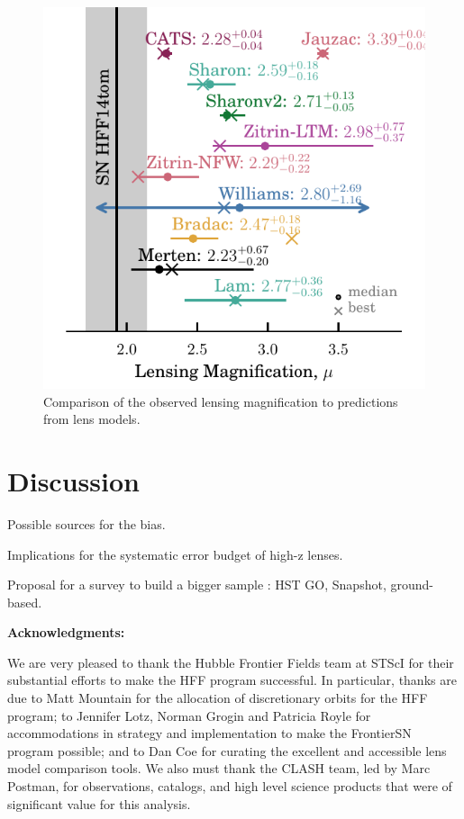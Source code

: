 \begin{figure}
\begin{center}
\includegraphics[width=\columnwidth]{FIG/lensing_test}
\caption{ 
Comparison of the observed lensing magnification to predictions from
lens models.
\label{fig:lensingtest} }
\end{center}
\end{figure}


\section{Discussion}

Possible sources for the bias. 

Implications for the systematic error budget of high-z lenses.

Proposal for a survey to build a bigger sample : HST GO, Snapshot, ground-based.

\bigskip


{\bf Acknowledgments:}

We are very pleased to thank the Hubble Frontier Fields team at STScI
for their substantial efforts to make the HFF program successful.  In
particular, thanks are due to Matt Mountain for the allocation of
discretionary orbits for the HFF program; to Jennifer Lotz, Norman
Grogin and Patricia Royle for accommodations in strategy and
implementation to make the FrontierSN program possible; and to Dan Coe
for curating the excellent and accessible lens model comparison tools.
We also must thank the CLASH team, led by Marc Postman, for
observations, catalogs, and high level science products that were of
significant value for this analysis.

